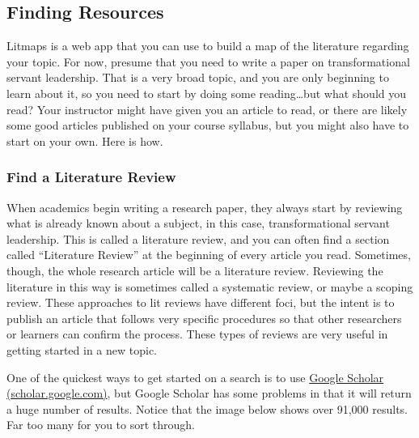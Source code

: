 \documentclass[
]{book}
\theoremstyle{definition}
\theoremstyle{definition}
\theoremstyle{definition}
\theoremstyle{definition}
\theoremstyle{remark}
\begin{document}
\hypertarget{finding-resources}{%
\subsection*{Finding Resources}\label{finding-resources}}

Litmaps is a web app that you can use to build a map of the literature regarding your topic. For now, presume that you need to write a paper on transformational servant leadership. That is a very broad topic, and you are only beginning to learn about it, so you need to start by doing some reading\ldots but what should you read? Your instructor might have given you an article to read, or there are likely some good articles published on your course syllabus, but you might also have to start on your own. Here is how.

\hypertarget{find-a-literature-review}{%
\subsubsection*{Find a Literature Review}\label{find-a-literature-review}}

When academics begin writing a research paper, they always start by reviewing what is already known about a subject, in this case, transformational servant leadership. This is called a literature review, and you can often find a section called ``Literature Review'' at the beginning of every article you read. Sometimes, though, the whole research article will be a literature review. Reviewing the literature in this way is sometimes called a systematic review, or maybe a scoping review. These approaches to lit reviews have different foci, but the intent is to publish an article that follows very specific procedures so that other researchers or learners can confirm the process. These types of reviews are very useful in getting started in a new topic.

One of the quickest ways to get started on a search is to use \href{https://scholar.google.com}{Google Scholar (scholar.google.com)}, but Google Scholar has some problems in that it will return a huge number of results. Notice that the image below shows over 91,000 results. Far too many for you to sort through.
\end{document}
